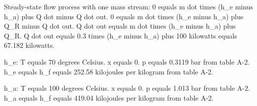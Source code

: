 Steady-state flow process with one mass stream:  
0 equals m dot times (h_e minus h_a) plus Q dot minus Q dot out.  
0 equals m dot times (h_e minus h_a) plus Q_R minus Q dot out.  
Q dot out equals m dot times (h_e minus h_a) plus Q_R.  
Q dot out equals 0.3 times (h_e minus h_a) plus 100 kilowatts equals 67.182 kilowatts.  

h_e:  
T equals 70 degrees Celsius.  
x equals 0.  
p equals 0.3119 bar from table A-2.  
h_e equals h_f equals 252.58 kilojoules per kilogram from table A-2.  

h_a:  
T equals 100 degrees Celsius.  
x equals 0.  
p equals 1.013 bar from table A-2.  
h_a equals h_f equals 419.04 kilojoules per kilogram from table A-2.